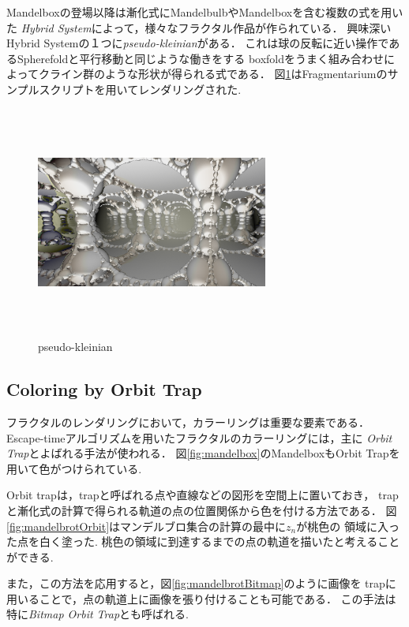Mandelboxの登場以降は漸化式にMandelbulbやMandelboxを含む複数の式を用いた
{\it Hybrid System}によって，様々なフラクタル作品が作られている．
興味深いHybrid Systemの１つに{\it pseudo-kleinian}がある．
これは球の反転に近い操作であるSpherefoldと平行移動と同じような働きをする
boxfoldをうまく組み合わせによってクライン群のような形状が得られる式である．
図\ref{fig:pseudoKleinian}はFragmentariumのサンプルスクリプトを用いてレンダリングされた.

\begin{figure}[htbp]
  \begin{center}
   \includegraphics[width=3in, height=3in, keepaspectratio]{../img/fractal/pseudoKleinian.pdf}
   \caption{pseudo-kleinian}
   \label{fig:pseudoKleinian}
  \end{center}
\end{figure}


\subsection{Coloring by Orbit Trap}

フラクタルのレンダリングにおいて，カラーリングは重要な要素である．
Escape-timeアルゴリズムを用いたフラクタルのカラーリングには，主に{\it
Orbit Trap}とよばれる手法が使われる．
図\ref{fig:mandelbox}のMandelboxもOrbit Trapを用いて色がつけられている.

Orbit trapは，trapと呼ばれる点や直線などの図形を空間上に置いておき，
trapと漸化式の計算で得られる軌道の点の位置関係から色を付ける方法である．
図\ref{fig:mandelbrotOrbit}はマンデルブロ集合の計算の最中に$z_n$が桃色の
領域に入った点を白く塗った.
桃色の領域に到達するまでの点の軌道を描いたと考えることができる.

また，この方法を応用すると，図\ref{fig:mandelbrotBitmap}のように画像を
trapに用いることで，点の軌道上に画像を張り付けることも可能である．
この手法は特に{\it Bitmap Orbit Trap}とも呼ばれる.

